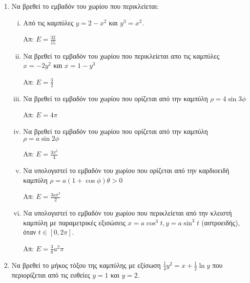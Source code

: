 


\pagestyle{askhseis}




\begin{center}
  \minibox{\large \bfseries \textcolor{Col1}{Ασκήσεις Επανάληψης}}
\end{center}

\vspace{2\baselineskip}

\begin{enumerate}


\item Να βρεθεί το εμβαδόν του χωρίου που περικλείεται:

\begin{enumerate}[i)]

\item Από τις καμπύλες $y=2-x^2$ και $y^3=x^2$.

\hfill Απ: $E=\frac{32}{15}$

\item Να βρεθεί το εμβαδόν του χωρίου που περικλείεται απο τις καμπύλες 
  $x=-2y^2$ και $x=1-y^3$

\hfill Απ: $E=\frac{3}{2}$

\item Να βρεθεί το εμβαδόν του χωρίου που ορίζεται από την καμπύλη $\rho=4\sin 3\phi$

\hfill Απ: $E=4\pi$

\item Να βρεθεί το εμβαδόν του χωρίου που ορίζεται από την καμπύλη $\rho=a\sin 2\phi$

\hfill Απ: $E=\frac{3\pi^2}{4}$

\item Να υπολογιστεί το εμβαδόν του χωρίου που ορίζεται από την καρδιοειδή καμπύλη $\rho=a(1+\cos \phi) \theta >0$

\hfill Απ: $E=\frac{3a\pi^2}{2}$

\item Να υπολογιστεί το εμβαδόν του χωρίου που περικλείεται από την κλειστή καμπύλη με παραμετρικές εξισώσεις $x=a\cos^3t, y=a\sin^3t$ (αστροειδής), όταν $t\in [0,2\pi]$.

\hfill Απ: $E=\frac{3}{8}a^2\pi$
\end{enumerate}

\item Να βρεθεί το μήκος τόξου της καμπύλης με εξίσωση $\frac{1}{4}y^2=x+\frac{1}{2}\ln y$ που περιορίζεται από τις ευθείες $y=1$ και $y=2$.


\end{enumerate}
